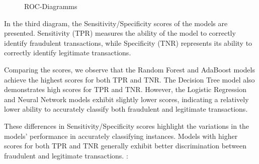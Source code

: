 \documentclass[a4, 10 pt, conference]{ieeeconf}  %
\begin{document}
{ 
\begin{figure}[h]
\centering
  \caption{ROC-Diagramms} 
  \end{figure}
  \begin{itemize}
  \textbfIn In the third diagram, the Sensitivity/Specificity scores of the models are presented. Sensitivity (TPR) measures the ability of the model to correctly identify fraudulent transactions, while Specificity (TNR) represents its ability to correctly identify legitimate transactions.

Comparing the scores, we observe that the Random Forest and AdaBoost models achieve the highest scores for both TPR and TNR. The Decision Tree model also demonstrates high scores for TPR and TNR. However, the Logistic Regression and Neural Network models exhibit slightly lower scores, indicating a relatively lower ability to accurately classify both fraudulent and legitimate transactions.

These differences in Sensitivity/Specificity scores highlight the variations in the models' performance in accurately classifying instances. Models with higher scores for both TPR and TNR generally exhibit better discrimination between fraudulent and legitimate transactions. :
\end{itemize}

}
\end{document}
